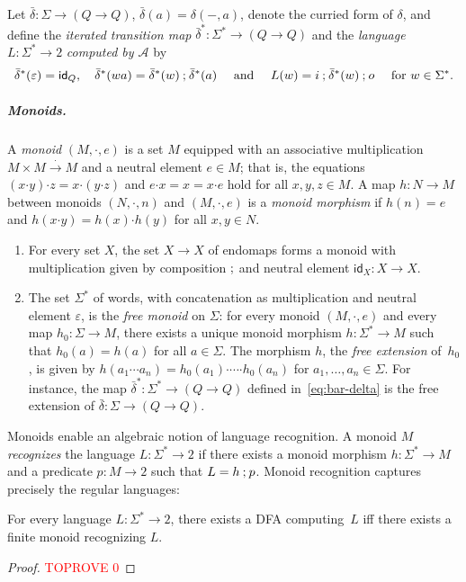 \documentclass[a4paper, UKenglish, numberwithinsect, thm-restate, cleveref, final]{lipics-v2021}
\newcommand{\resetCurThmBraces}{\gdef\curThmBraceOpen{(}\gdef\curThmBraceClose{)}}
\newcommand{\removeThmBraces}{\gdef\curThmBraceOpen{}\gdef\curThmBraceClose{}}
\newenvironment{notheorembrackets}{\removeThmBraces}{\resetCurThmBraces}
\theoremstyle{plain}
\theoremstyle{definition}
\newcommand{\nil}{\ensuremath{\varepsilon}}
\newcommand{\seq}{\ensuremath{\mathbin{\text{\upshape;}}}}
\newcommand{\id}{\ensuremath{\mathsf{id}}}
\newcommand{\xto}{\xrightarrow}
\newcommand{\mult}{\mathbin{\boldsymbol{\cdot}}}
\newcommand{\A}{\ensuremath{\mathcal{A}}\xspace}
\numberwithin{equation}{section}
\begin{document}
Let $\bar\delta\colon \Sigma\to (Q\to Q)$, $\bar\delta(a) = \delta(-, a)$, denote the curried  form of $\delta$, and define the \emph{iterated transition map} $\bar\delta^* \colon \Sigma^{*} \rightarrow (Q \rightarrow Q)$ and the \emph{language} $L \colon \Sigma^{*} \rightarrow 2$ \emph{computed by \A} by
\begin{equation}
  \bar \delta^{*}(\varepsilon) = \id_{Q}, \quad \bar \delta^{*}(wa) = \bar \delta^{*}(w) \seq \bar \delta^{*}(a) \quad \text{ and } \quad L(w) = i \seq \bar \delta^{*}(w) \seq o \quad \text{ for } w \in \Sigma^{*}.\label{eq:bar-delta}
\end{equation}
\subparagraph{Monoids.} A \emph{monoid} $(M,\mult ,e)$ is a set $M$ equipped with an
associative multiplication $ M\times M\xto{\mult } M$ and a neutral
element $e\in M$; that is, the equations
$(x\mult y) \mult z = x\mult(y\mult z)$ and $e\mult x=x=x\mult e$
hold for all $x,y,z\in M$.
A map \(h \colon N \rightarrow M\) between monoids \((N, \mult, n)\) and \((M, \mult, e)\) is a \emph{monoid morphism} if $h(n)=e$ and $h(x\mult y)=h(x)\mult h(y)$ for all $x,y\in N$.
\begin{expl}\label{ex:monoids}
\begin{enumerate}[(1)]
\item For every set $X$, the set $X\to X$ of endomaps forms a monoid with multiplication given by composition $\seq$ and neutral element $\id_X\colon X\to X$.
  \item The set $\Sigma^*$ of words, with concatenation as multiplication  and neutral element $\nil$, is the \emph{free monoid}
  on $\Sigma$: for every monoid $(M,\mult,e)$ and every map $h_0\colon \Sigma\to M$, there
  exists a unique monoid morphism $h\colon \Sigma^*\to M$ such that $h_0(a)=h(a)$ for all
  $a\in \Sigma$. The morphism $h$, the \emph{free extension} of~$h_0$, is given by
  $h(a_1\cdots a_n)=h_0(a_1)\mult\cdots\mult h_0(a_n)$ for $a_1,\ldots,a_n\in \Sigma$.  For
  instance, the map $\bar \delta^*\colon \Sigma^*\to (Q\to Q)$ defined in~\eqref{eq:bar-delta}
  is the free extension of $\bar \delta\colon \Sigma\to (Q\to Q)$.
\end{enumerate}
\end{expl}
Monoids enable an algebraic notion of language recognition. A monoid $M$ \emph{recognizes} the language $L\colon \Sigma^*\to 2$ if there exists a monoid morphism $h\colon \Sigma^*\to M$ and a predicate $p\colon M\to 2$ such that $L = h \seq p$.
Monoid recognition captures precisely the regular languages:
\begin{notheorembrackets}
\begin{theorem}[{\cite[Thm.\ 1]{rs59}}]
  For every language $L\colon \Sigma^*\to 2$, there exists a DFA computing~$L$ iff there exists a finite monoid recognizing $L$.
\end{theorem}
\end{notheorembrackets}
\begin{proof}\textcolor{red}{TOPROVE 0}\end{proof}
\end{document}
